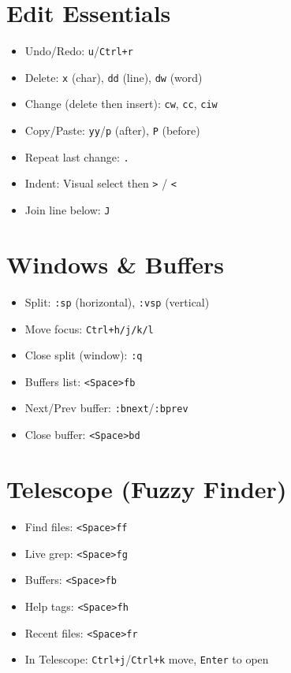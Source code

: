 \documentclass[9pt,twocolumn]{extarticle}
\newcommand{\key}[1]{\mbox{\texttt{#1}}}
\newcommand{\leader}{\key{<Space>}} %
\begin{document}
\section{Edit Essentials}
\begin{itemize}
  \item Undo/Redo: \key{u}/\key{Ctrl+r}
  \item Delete: \key{x} (char), \key{dd} (line), \key{dw} (word)
  \item Change (delete then insert): \key{cw}, \key{cc}, \key{ciw}
  \item Copy/Paste: \key{yy}/\key{p} (after), \key{P} (before)
  \item Repeat last change: \key{.}
  \item Indent: Visual select then \key{>} / \key{<}
  \item Join line below: \key{J}
\end{itemize}

\section{Windows \& Buffers}
\begin{itemize}
  \item Split: \key{:sp} (horizontal), \key{:vsp} (vertical)
  \item Move focus: \key{Ctrl+h/j/k/l}
  \item Close split (window): \key{:q}
  \item Buffers list: \leader\key{fb}
  \item Next/Prev buffer: \key{:bnext}/\key{:bprev}
  \item Close buffer: \leader\key{bd}
\end{itemize}

\section{Telescope (Fuzzy Finder)}
\begin{itemize}
  \item Find files: \leader\key{ff}
  \item Live grep: \leader\key{fg}
  \item Buffers: \leader\key{fb}
  \item Help tags: \leader\key{fh}
  \item Recent files: \leader\key{fr}
  \item In Telescope: \key{Ctrl+j}/\key{Ctrl+k} move, \key{Enter} to open
\end{itemize}
\end{document}
